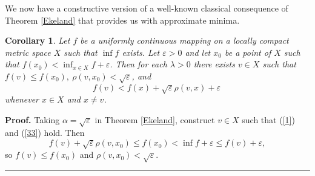 \documentclass[11pt]{article}%
\newtheorem{corollary}[theorem]{Corollary}
\newenvironment{proof}[1][Proof]{\noindent\textbf{#1.} }{\ \rule{0.5em}{0.5em}}
\begin{document}
We now have a constructive version of a well-known classical consequence of
Theorem \ref{Ekeland} that provides us with approximate minima.

\begin{corollary}
\label{Ekecor}Let $f$ be a uniformly continuous mapping on a locally compact
metric space $X$ such that $\inf f$ exists. Let $\varepsilon>0$ and let
$x_{0}$ be a point of $X$ such that $f(x_{0})<\inf_{x\in X}f+\varepsilon$.
Then for each $\lambda>0$ there exists $v\in X$ such that $f(v)\leqslant
f(x_{0}),\ \rho\left(  v,x_{0}\right)  <\sqrt{\varepsilon}$, and%
\begin{equation}
f\left(  v\right)  <f(x)+\sqrt{\varepsilon}\rho\left(  v,x\right)
+\varepsilon\ \label{33}%
\end{equation}
whenever $x\in X$ and $x\neq v$.
\end{corollary}

\begin{proof}
Taking $\alpha=\sqrt{\varepsilon}$ in Theorem \ref{Ekeland}, construct $v\in
X$ such that (\ref{1}) and (\ref{33}) hold. Then%
\[
f(v)+\sqrt{\varepsilon}\rho\left(  v,x_{0}\right)  \leqslant f\left(
x_{0}\right)  <\inf f+\varepsilon\leqslant f(v)+\varepsilon,
\]
so $f(v)\leqslant f(x_{0})$ and $\rho(v,x_{0})<\sqrt{\varepsilon}$.
\end{proof}
\end{document}
